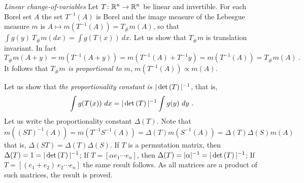 \documentclass[12pt,a4paper]{amsart}
\theoremstyle{plain}%
\theoremstyle{definition}
\theoremstyle{remark}
\begin{document}
\emph{Linear change-of-variables}
Let $T \colon \mathbb{R}^n \to \mathbb{R}^n$ be linear and invertible. For each Borel set $A$ the set $T^{-1}(A)$ is Borel and the image measure of the Lebesgue measure $m$ is $A \mapsto m(T^{-1}(A)) = T_{\#} m (A)$, so that $\int g(y) \ T_{\#}m(dx) = \int g(T(x)) \ dx$. Let us show that $T_{\#}m$ is translation invariant. In fact
\begin{equation*}
T_{\#}m(A + y) = m(T^{-1}(A + y)) = m(T^{-1}(A) + T^{-1}y) = m(T^{-1}(A)) = T_{\#}m(A) \ .
\end{equation*}
It follows that \emph{$T_{\#}m$ is proportional to $m$}, $m(T^{-1}(A)) \propto m(A)$.

Let us show that \emph{the proportionality constant is $|\operatorname{det}\left(T\right)|^{-1}$}, that is,
\begin{equation*}
\int g(T(x)) \ dx = |\detof{T}|^{-1} \int g(y) \ dy \ .
\end{equation*}
Let us write the proportionality constant $\Delta(T)$. Note that $m((ST)^{-1}(A)) = m(T^{-1}S^{-1}(A)) = \Delta(T)m(S^{-1}(A)) = \Delta(T)\Delta(S)m(A)$ that is, $\Delta(ST) = \Delta(T)\Delta(S)$. If $T$ is a permutation matrix, then $\Delta(T) = 1 = |\operatorname{det}\left(T\right)|^{-1}$; If $T = [\alpha e_1 \cdots e_n]$, then $\Delta(T) = |\alpha|^{-1} = |\operatorname{det}\left(T\right)|^{-1}$; If $T = [(e_1+e_2) \ e_2 \cdots e_n]$ the same result follows. As all matrices are a product of such matrices, the result is proved.
\end{document}

